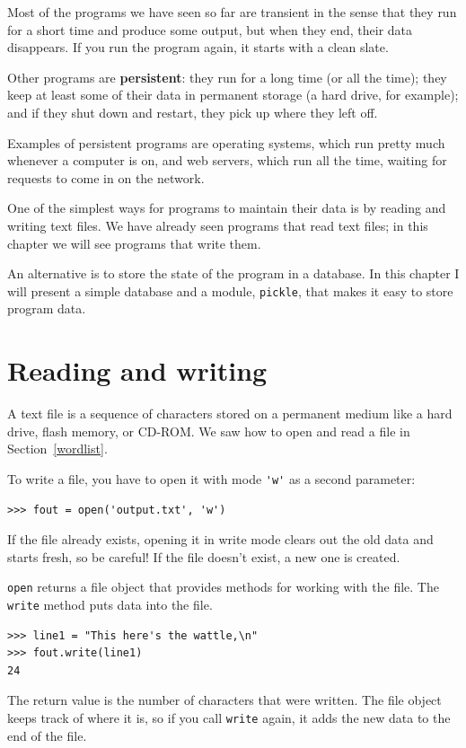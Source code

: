 \documentclass[10pt]{book}
\begin{document}
Most of the programs we have seen so far are transient in the
sense that they run for a short time and produce some output,
but when they end, their data disappears.  If you run the program
again, it starts with a clean slate.

Other programs are {\bf persistent}: they run for a long time
(or all the time); they keep at least some of their data
in permanent storage (a hard drive, for example); and
if they shut down and restart, they pick up where they left off.

Examples of persistent programs are operating systems, which
run pretty much whenever a computer is on, and web servers,
which run all the time, waiting for requests to come in on
the network.

One of the simplest ways for programs to maintain their data
is by reading and writing text files.  We have already seen
programs that read text files; in this chapter we will see programs
that write them.

An alternative is to store the state of the program in a database.
In this chapter I will present a simple database and a module,
{\tt pickle}, that makes it easy to store program data.


\section{Reading and writing}

A text file is a sequence of characters stored on a permanent
medium like a hard drive, flash memory, or CD-ROM.  We saw how
to open and read a file in Section~\ref{wordlist}.

To write a file, you have to open it with mode \verb"'w'" as a second
parameter:

\begin{verbatim}
>>> fout = open('output.txt', 'w')
\end{verbatim}
%
If the file already exists, opening it in write mode clears out
the old data and starts fresh, so be careful!
If the file doesn't exist, a new one is created.

{\tt open} returns a file object that provides methods for working
with the file.
The {\tt write} method puts data into the file.

\begin{verbatim}
>>> line1 = "This here's the wattle,\n"
>>> fout.write(line1)
24
\end{verbatim}
%
The return value is the number of characters that were written.
The file object keeps track of where it is, so if
you call {\tt write} again, it adds the new data to the end of
the file.
\end{document}
